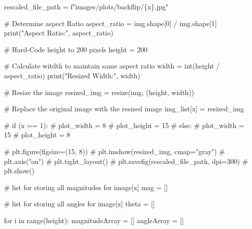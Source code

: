 \documentclass[
  letterpaper,
  DIV=11,
  numbers=noendperiod]{scrreprt}
\newenvironment{Shaded}{\begin{snugshade}}{\end{snugshade}}
\newcommand{\BuiltInTok}[1]{\textcolor[rgb]{0.00,0.23,0.31}{#1}}
\newcommand{\CommentTok}[1]{\textcolor[rgb]{0.37,0.37,0.37}{#1}}
\newcommand{\ControlFlowTok}[1]{\textcolor[rgb]{0.00,0.23,0.31}{#1}}
\newcommand{\DecValTok}[1]{\textcolor[rgb]{0.68,0.00,0.00}{#1}}
\newcommand{\KeywordTok}[1]{\textcolor[rgb]{0.00,0.23,0.31}{#1}}
\newcommand{\NormalTok}[1]{\textcolor[rgb]{0.00,0.23,0.31}{#1}}
\newcommand{\OperatorTok}[1]{\textcolor[rgb]{0.37,0.37,0.37}{#1}}
\newcommand{\SpecialCharTok}[1]{\textcolor[rgb]{0.37,0.37,0.37}{#1}}
\newcommand{\SpecialStringTok}[1]{\textcolor[rgb]{0.13,0.47,0.30}{#1}}
\newcommand{\StringTok}[1]{\textcolor[rgb]{0.13,0.47,0.30}{#1}}
\begin{document}
\begin{Shaded}
\begin{Highlighting}[]
\NormalTok{    rescaled\_file\_path }\OperatorTok{=} \SpecialStringTok{f"images/plots/backflip/}\SpecialCharTok{\{}\NormalTok{x}\SpecialCharTok{\}}\SpecialStringTok{.jpg"}

    \CommentTok{\# Determine aspect Ratio}
\NormalTok{    aspect\_ratio }\OperatorTok{=}\NormalTok{ img.shape[}\DecValTok{0}\NormalTok{] }\OperatorTok{/}\NormalTok{ img.shape[}\DecValTok{1}\NormalTok{]}
    \BuiltInTok{print}\NormalTok{(}\StringTok{"Aspect Ratio:"}\NormalTok{, aspect\_ratio)}

    \CommentTok{\# Hard{-}Code height to 200 pixels}
\NormalTok{    height }\OperatorTok{=} \DecValTok{200}

    \CommentTok{\# Calculate witdth to maintain same aspect ratio}
\NormalTok{    width }\OperatorTok{=} \BuiltInTok{int}\NormalTok{(height }\OperatorTok{/}\NormalTok{ aspect\_ratio)}
    \BuiltInTok{print}\NormalTok{(}\StringTok{"Resized Width:"}\NormalTok{, width)}

    \CommentTok{\# Resize the image}
\NormalTok{    resized\_img }\OperatorTok{=}\NormalTok{ resize(img, (height, width))}

    \CommentTok{\# Replace the original image with the resized image}
\NormalTok{    img\_list[x] }\OperatorTok{=}\NormalTok{ resized\_img}

    \CommentTok{\# if (x == 1):}
    \CommentTok{\#   plot\_width = 8}
    \CommentTok{\#   plot\_height = 15}
    \CommentTok{\# else:}
    \CommentTok{\#   plot\_width = 15}
    \CommentTok{\#   plot\_height = 8}

    \CommentTok{\# plt.figure(figsize=(15, 8))}
    \CommentTok{\# plt.imshow(resized\_img, cmap="gray")}
    \CommentTok{\# plt.axis("on")}
    \CommentTok{\# plt.tight\_layout()}
    \CommentTok{\# plt.savefig(rescaled\_file\_path, dpi=300)}
    \CommentTok{\# plt.show()}

    \CommentTok{\# list for storing all magnitudes for image[x]}
\NormalTok{    mag }\OperatorTok{=}\NormalTok{ []}

    \CommentTok{\# list for storing all angles for image[x]}
\NormalTok{    theta }\OperatorTok{=}\NormalTok{ []}

    \ControlFlowTok{for}\NormalTok{ i }\KeywordTok{in} \BuiltInTok{range}\NormalTok{(height):}
\NormalTok{        magnitudeArray }\OperatorTok{=}\NormalTok{ []}
\NormalTok{        angleArray }\OperatorTok{=}\NormalTok{ []}


\end{Highlighting}
\end{Shaded}
\end{document}
